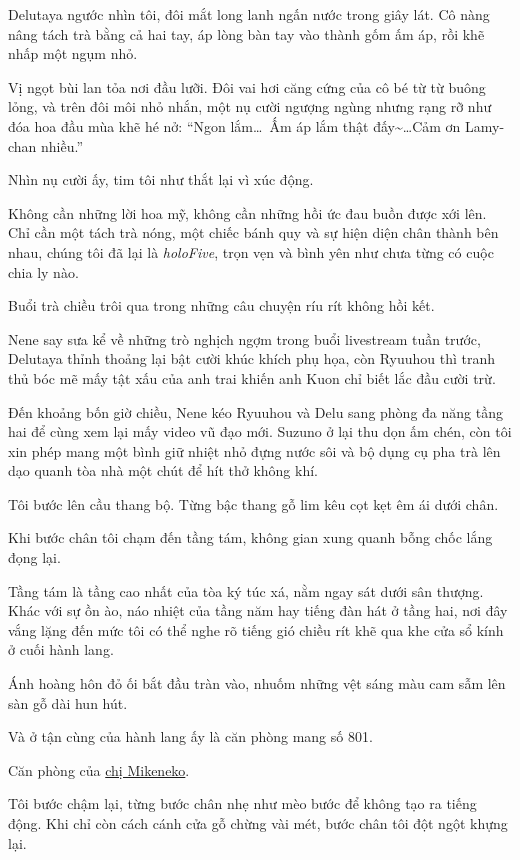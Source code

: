 \documentclass[../main.tex]{subfiles}
\begin{document}
Delutaya ngước nhìn tôi, đôi mắt long lanh ngấn nước trong giây lát. Cô nàng nâng tách trà bằng cả hai tay, áp lòng bàn tay vào thành gốm ấm áp, rồi khẽ nhấp một ngụm nhỏ.

Vị ngọt bùi lan tỏa nơi đầu lưỡi. Đôi vai hơi căng cứng của cô bé từ từ buông lỏng, và trên đôi môi nhỏ nhắn, một nụ cười ngượng ngùng nhưng rạng rỡ như đóa hoa đầu mùa khẽ hé nở: ``Ngon lắm\dots\ Ấm áp lắm thật đấy\~{}\dots Cảm ơn Lamy-chan nhiều.''

Nhìn nụ cười ấy, tim tôi như thắt lại vì xúc động.

Không cần những lời hoa mỹ, không cần những hồi ức đau buồn được xới lên. Chỉ cần một tách trà nóng, một chiếc bánh quy và sự hiện diện chân thành bên nhau, chúng tôi đã lại là \textit{holoFive}, trọn vẹn và bình yên như chưa từng có cuộc chia ly nào.

\ct

Buổi trà chiều trôi qua trong những câu chuyện ríu rít không hồi kết.

Nene say sưa kể về những trò nghịch ngợm trong buổi livestream tuần trước, Delutaya thỉnh thoảng lại bật cười khúc khích phụ họa, còn Ryuuhou thì tranh thủ bóc mẽ mấy tật xấu của anh trai khiến anh Kuon chỉ biết lắc đầu cười trừ.

Đến khoảng bốn giờ chiều, Nene kéo Ryuuhou và Delu sang phòng đa năng tầng hai để cùng xem lại mấy video vũ đạo mới. Suzuno ở lại thu dọn ấm chén, còn tôi xin phép mang một bình giữ nhiệt nhỏ đựng nước sôi và bộ dụng cụ pha trà lên dạo quanh tòa nhà một chút để hít thở không khí.

Tôi bước lên cầu thang bộ. Từng bậc thang gỗ lim kêu cọt kẹt êm ái dưới chân.

Khi bước chân tôi chạm đến tầng tám, không gian xung quanh bỗng chốc lắng đọng lại.

Tầng tám là tầng cao nhất của tòa ký túc xá, nằm ngay sát dưới sân thượng. Khác với sự ồn ào, náo nhiệt của tầng năm hay tiếng đàn hát ở tầng hai, nơi đây vắng lặng đến mức tôi có thể nghe rõ tiếng gió chiều rít khẽ qua khe cửa sổ kính ở cuối hành lang.

Ánh hoàng hôn đỏ ối bắt đầu tràn vào, nhuốm những vệt sáng màu cam sẫm lên sàn gỗ dài hun hút.

Và ở tận cùng của hành lang ấy là căn phòng mang số 801.

Căn phòng của \uline{chị Mikeneko}.

Tôi bước chậm lại, từng bước chân nhẹ như mèo bước để không tạo ra tiếng động. Khi chỉ còn cách cánh cửa gỗ chừng vài mét, bước chân tôi đột ngột khựng lại.
\end{document}

